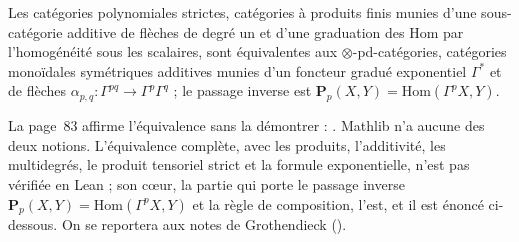 \begin{encadre}
\begin{theoreme*}\nonverifie
Les catégories polynomiales strictes, catégories à produits finis munies d'une sous-catégorie additive de flèches de degré un et d'une graduation des $\mathrm{Hom}$ par l'homogénéité sous les scalaires, sont équivalentes aux $\otimes$-pd-catégories, catégories monoïdales symétriques additives munies d'un foncteur gradué exponentiel $\Gamma^*$ et de flèches $\alpha_{p,q} : \Gamma^{pq} \to \Gamma^p\Gamma^q$ ; le passage inverse est $\mathbf P_p(X, Y) = \mathrm{Hom}(\Gamma^p X, Y)$.
\end{theoreme*}
\end{encadre}
{\small La page~83 affirme l'équivalence sans la démontrer : . Mathlib n'a aucune des deux notions. L'équivalence complète, avec les produits, l'additivité, les multidegrés, le produit tensoriel strict et la formule exponentielle, n'est pas vérifiée en Lean ; son c\oe ur, la partie qui porte le passage inverse $\mathbf P_p(X, Y) = \mathrm{Hom}(\Gamma^p X, Y)$ et la règle de composition, l'est, et il est énoncé ci-dessous. On se reportera aux notes de Grothendieck ().\par}

